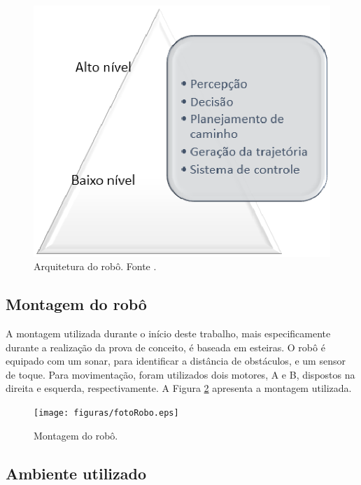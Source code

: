 		\begin{figure}[H]
			\centering
			\includegraphics[scale=0.6]{figuras/camadas.eps}
			\caption[Arquitetura do robô]{Arquitetura do robô. Fonte \cite{vieira}.}
			\label{img:camadas}
		\end{figure}

	\subsection{Montagem do robô} %
	\label{sub:montagem_do_robô}
		
		A montagem utilizada durante o início deste trabalho, mais especificamente durante a realização da prova de conceito, é baseada em esteiras. O robô é equipado com um sonar, para identificar a distância de obstáculos, e um sensor de toque. Para movimentação, foram utilizados dois motores, A e B, dispostos na direita e esquerda, respectivamente. A Figura \ref{img:fotoRobo} apresenta a montagem utilizada.

		\begin{figure}[H]
			\centering
			\texttt{[image: figuras/fotoRobo.eps]}
			\caption[Montagem do robô]{Montagem do robô.}
			\label{img:fotoRobo}
		\end{figure}

	\subsection{Ambiente utilizado} %
	\label{sub:ambiente_utilizado}
		
